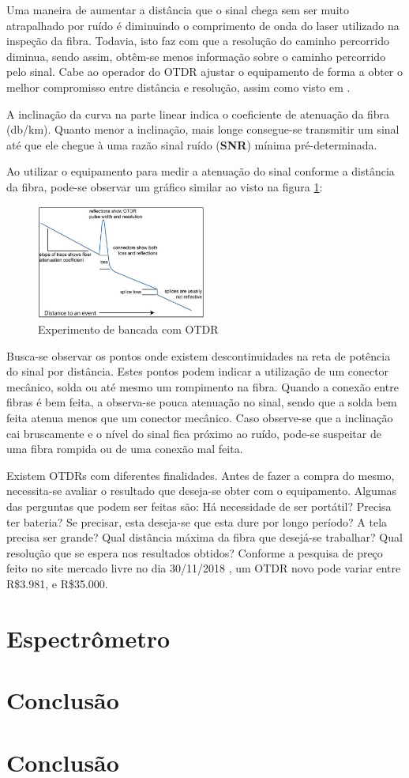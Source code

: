 \documentclass[article]{IEEEtran}
\begin{document}
Uma maneira de aumentar a distância que o sinal chega sem ser muito atrapalhado por ruído é diminuindo o comprimento de onda do laser utilizado na inspeção da fibra. Todavia, isto faz com que a resolução do caminho percorrido diminua, sendo assim, obtêm-se menos informação sobre o caminho percorrido pelo sinal. Cabe ao operador do OTDR ajustar o equipamento de forma a obter o melhor compromisso entre distância e resolução, assim como visto em \cite{OTDR_LAB}.

A inclinação da curva na parte linear indica o coeficiente de atenuação da fibra (db/km). Quanto menor a inclinação, mais longe consegue-se transmitir um sinal até que ele chegue à uma razão sinal ruído (\textbf{SNR}) mínima pré-determinada.

Ao utilizar o equipamento para medir a atenuação do sinal conforme a distância da fibra, pode-se observar um gráfico similar ao visto na figura \ref{fig:OTDR_grafico}:
\begin{figure}[H]
	\includegraphics[width=0.5\textwidth]{images/OTDR_grafico.JPG}
	\caption{Experimento de bancada com OTDR}
	\label{fig:OTDR_grafico}
\end{figure} 

Busca-se observar os pontos onde existem descontinuidades na reta de potência do sinal por distância. Estes pontos podem indicar a utilização de um conector mecânico, solda ou até mesmo um rompimento na fibra. Quando a conexão entre fibras é bem feita, a observa-se pouca atenuação no sinal, sendo que a solda bem feita atenua menos que um conector mecânico. Caso observe-se que a inclinação cai bruscamente e o nível do sinal fica próximo ao ruído, pode-se suspeitar de uma fibra rompida ou de uma conexão mal feita.

Existem OTDRs com diferentes finalidades. Antes de fazer a compra do mesmo, necessita-se avaliar o resultado que deseja-se obter com o equipamento. Algumas das perguntas que podem ser feitas são: Há necessidade de ser portátil? Precisa ter bateria? Se precisar, esta deseja-se que esta dure por longo período? A tela precisa ser grande? Qual distância máxima da fibra que desejá-se trabalhar? Qual resolução que se espera nos resultados obtidos? Conforme a pesquisa de preço feito no site mercado livre no dia 30/11/2018 \cite{M_LIVRE}, um OTDR novo pode variar entre R\$3.981, e R\$35.000.

\section{Espectrômetro}


\section{Conclusão}




\section{Conclusão}
\end{document}
